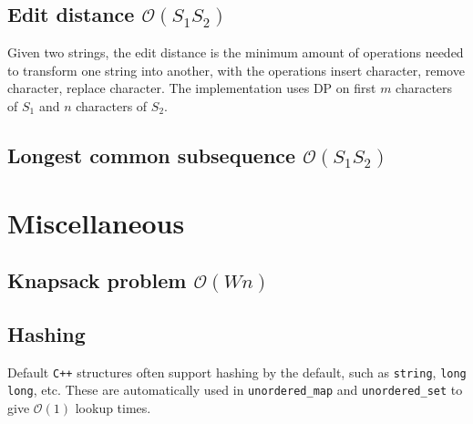 


\subsection{Edit distance $\mathcal O(S_1S_2)$}

Given two strings, the edit distance is the minimum amount of operations needed to transform one string into another, with the operations insert character, remove character, replace character. The implementation uses DP on first $m$ characters of $S_1$ and $n$ characters of $S_2$.







\subsection{Longest common subsequence $\mathcal O(S_1S_2)$}






\section{Miscellaneous}

\subsection{Knapsack problem $\mathcal O(Wn)$}




\subsection{Hashing}

Default \texttt{C++} structures often support hashing by the default, such as \texttt{string}, \texttt{long long}, etc. These are automatically used in \texttt{unordered\_map} and \texttt{unordered\_set} to give $\mathcal O(1)$ lookup times.

